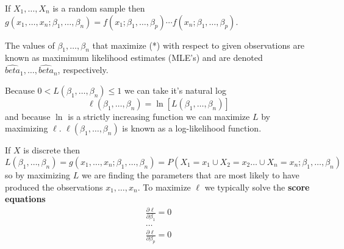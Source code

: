 \documentclass{article}
\begin{document}
If $X_1,\ldots,X_n$ is a random sample then $g(x_1,\ldots,x_n;\beta_1,\ldots,\beta_n) = f(x_1;\beta_1,\ldots,\beta_p) \cdots  f(x_n;\beta_1,\ldots,\beta_p)$.

The values of $\beta_1,\ldots,\beta_n$ that maximize (*) with respect to given observations are known as maximimum likelihood estimates (MLE's) and are denoted $\hat{beta}_1,\ldots,\hat{beta}_n$, respectively.

Because $0<L(\beta_1,\ldots,\beta_n) \leq 1$ we can take it's natural log
\[
\ell(\beta_1,\ldots,\beta_n) = \ln[L(\beta_1,\ldots,\beta_n)]
\]
and because $\ln$ is a strictly increasing function we can maximize $L$ by maximizing $\ell$. $\ell(\beta_1,\ldots,\beta_n)$ is known as a log-likelihood function.

If $X$ is discrete then
\[
L(\beta_1,\ldots,\beta_n) = g(x_1,\ldots,x_n;\beta_1,\ldots,\beta_n) = P(X_1=x_1 \cup X_2=x_2 \ldots \cup X_n = x_n;\beta_1,\ldots,\beta_n)
\]
so by maximizing $L$ we are finding the parameters that are most likely to have produced the observations $x_1,\ldots,x_n$.
To maximize $\ell$ we typically solve the \textbf{score equations}
\begin{align*} 
\frac{\partial \ell}{\partial \beta_1}=0 \\
\ldots \\
\frac{\partial \ell}{\partial \beta_p}=0
\end{align*} 
\end{document}

